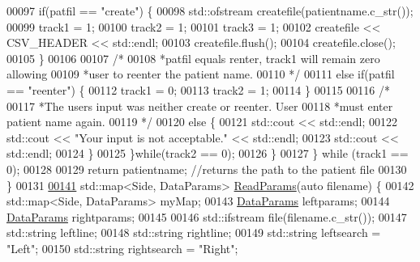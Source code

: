 \begin{DoxyCode}
00097                     \textcolor{keywordflow}{if}(patfil == \textcolor{stringliteral}{"create"}) \{
00098                         std::ofstream createfile(patientname.c\_str());
00099                         track1 = 1;
00100                         track2 = 1;
00101                         track3 = 1;
00102                         createfile << CSV\_HEADER << std::endl;
00103                         createfile.flush();
00104                         createfile.close();
00105                     \}
00106 
00107                     \textcolor{comment}{/*}
00108 \textcolor{comment}{                     *patfil equals renter, track1 will remain zero allowing}
00109 \textcolor{comment}{                     *user to reenter the patient name.}
00110 \textcolor{comment}{                     */}
00111                     \textcolor{keywordflow}{else} \textcolor{keywordflow}{if}(patfil == \textcolor{stringliteral}{"reenter"}) \{
00112                         track1 = 0;
00113                         track2 = 1;
00114                     \}
00115 
00116                     \textcolor{comment}{/*}
00117 \textcolor{comment}{                     *The users input was neither create or reenter. User}
00118 \textcolor{comment}{                     *must enter patient name again.}
00119 \textcolor{comment}{                     */}
00120                     \textcolor{keywordflow}{else} \{
00121                         std::cout << std::endl;
00122                         std::cout << \textcolor{stringliteral}{"Your input is not acceptable."} << std::endl;
00123                         std::cout << std::endl;
00124                     \}
00125                 \}\textcolor{keywordflow}{while}(track2 == 0);
00126             \}
00127         \} \textcolor{keywordflow}{while} (track1 == 0);
00128 
00129         \textcolor{keywordflow}{return} patientname; \textcolor{comment}{//returns the path to the patient file}
00130     \}
00131 
\hypertarget{fileio_8hpp_source_l00141}{}\hyperlink{namespacevaso_afc1435dcb9c37b3ccde589738b26c909}{00141}     std::map<Side, DataParams> \hyperlink{namespacevaso_afc1435dcb9c37b3ccde589738b26c909}{ReadParams}(\textcolor{keyword}{auto} filename) \{
00142         std::map<Side, DataParams> myMap;
00143         \hyperlink{structDataParams}{DataParams} leftparams;
00144         \hyperlink{structDataParams}{DataParams} rightparams;
00145 
00146         std::ifstream file(filename.c\_str());
00147         std::string leftline;
00148         std::string rightline;
00149         std::string leftsearch = \textcolor{stringliteral}{"Left"};
00150         std::string rightsearch = \textcolor{stringliteral}{"Right"};

\end{DoxyCode}
